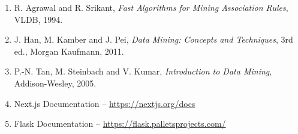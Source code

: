 \documentclass[11pt,a4paper]{article}
\begin{document}
\begin{enumerate}[leftmargin=1.4em]
  \item R. Agrawal and R. Srikant, \emph{Fast Algorithms for Mining
        Association Rules}, VLDB, 1994.
  \item J. Han, M. Kamber and J. Pei, \emph{Data Mining: Concepts and
        Techniques}, 3rd ed., Morgan Kaufmann, 2011.
  \item P.-N. Tan, M. Steinbach and V. Kumar, \emph{Introduction to Data
        Mining}, Addison-Wesley, 2005.
  \item Next.js Documentation -- \url{https://nextjs.org/docs}
  \item Flask Documentation -- \url{https://flask.palletsprojects.com/}
\end{enumerate}
\end{document}
